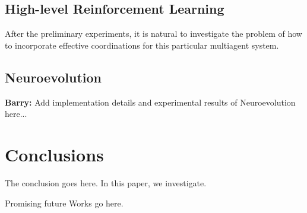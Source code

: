 \documentclass[conference]{IEEEtran}
\begin{document}
\subsection{High-level Reinforcement Learning}
After the preliminary experiments, it is natural to investigate the problem of how
to incorporate effective coordinations for this particular multiagent system.


\subsection{Neuroevolution}

\textbf{Barry:}
Add implementation details and experimental results of Neuroevolution here...




\section{Conclusions} \label{conclusion}
The conclusion goes here. In this paper, we investigate.

Promising future Works go here.












\end{document}
